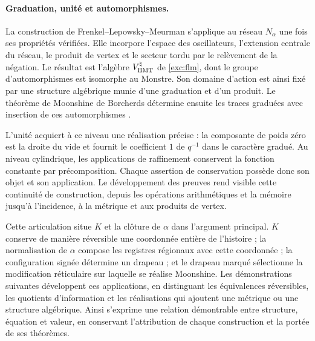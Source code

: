 \paragraph{Graduation, unité et automorphismes.}
\label{inc-ampl-automorfismos}
La construction de Frenkel--Lepowsky--Meurman s'applique au réseau
$N_\alpha$ une fois ses propriétés vérifiées. Elle incorpore l'espace
des oscillateurs, l'extension centrale du réseau, le produit de vertex
et le secteur tordu par le relèvement de la négation. Le résultat est
l'algèbre $V^\natural_{\rm HMT}$ de \eqref{exc:flm}, dont le groupe
d'automorphismes est isomorphe au Monstre. Son domaine d'action est ainsi
fixé par une structure algébrique munie d'une graduation et d'un produit. Le théorème
de Moonshine de Borcherds détermine ensuite les traces graduées
avec insertion de ces automorphismes \cite{flm,borcherds}.

L'unité acquiert à ce niveau une réalisation précise : la composante
de poids zéro est la droite du vide et fournit le coefficient $1$ de
$q^{-1}$ dans le caractère gradué. Au niveau cylindrique, les
applications de raffinement conservent la fonction constante par
précomposition. Chaque assertion de conservation possède donc son
objet et son application. Le développement des preuves rend visible cette
continuité de construction, depuis les opérations arithmétiques et la
mémoire jusqu'à l'incidence, à la métrique et aux produits de vertex.

Cette articulation situe $K$ et la clôture de $\alpha$ dans l'argument
principal. $K$ conserve de manière réversible une coordonnée entière de
l'histoire ; la normalisation de $\alpha$ compose les registres régionaux
avec cette coordonnée ; la configuration signée détermine un drapeau ; et
le drapeau marqué sélectionne la modification réticulaire sur laquelle se
réalise Moonshine. Les démonstrations suivantes développent ces
applications, en distinguant les équivalences réversibles, les quotients
d'information et les réalisations qui ajoutent une métrique ou une structure
algébrique. Ainsi s'exprime une relation démontrable entre structure,
équation et valeur, en conservant l'attribution de chaque construction et la
portée de ses théorèmes.
